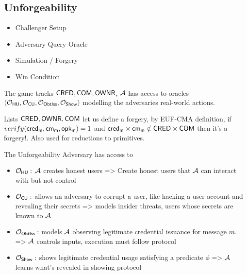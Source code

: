 \subsection{Unforgeability}
\begin{itemize}
    \item Challenger Setup
    \item Adversary Query Oracle
    \item Simulation / Forgery
    \item Win Condition
\end{itemize}
The game tracks $\mathsf{CRED}, \mathsf{COM}, \mathsf{OWNR}$, $\mathcal{A}$ has access to oracles $(\mathcal{O}_{\mathsf{HU}}, \mathcal{O}_{\mathsf{CU}}, \mathcal{O}_{\mathsf{ObtIss}}, \mathcal{O}_{\mathsf{Show}})$ modelling the adversaries real-world actions. 

Lists $\mathsf{CRED}, \mathsf{OWNR}, \mathsf{COM}$ let us define a forgery, by EUF-CMA definition, if $verify(\mathsf{cred_m}, \mathsf{cm_m}, \mathsf{opk_m}) = 1$ and $\mathsf{cred_m} \times \mathsf{cm_m} \notin \mathsf{CRED} \times \mathsf{COM}$ then it's a forgery!. Also used for reductions to primitives.

The Unforgeability Adversary has access to 
\begin{itemize}
    \item $\mathcal{O}_{\mathsf{HU}}:$ $\mathcal{A}$ creates honest users => Create honest users that $\mathcal{A}$ can interact with but not control
    \item $\mathcal{O}_{\mathsf{CU}}:$ allows an adversary to corrupt a user, like hacking a user account and revealing their secrets => models insider threats, users whose secrets are known to $\mathcal{A}$
    \item $\mathcal{O}_{\mathsf{ObtIss}}:$ models $\mathcal{A}$ observing legitimate credential issuance for message $m$. => $\mathcal{A}$ controls inputs, execution must follow protocol
    \item $\mathcal{O}_{\mathsf{Show}}:$ shows legitimate credential usage satisfying a predicate $\phi$ => $\mathcal{A}$ learns what's revealed in showing protocol
\end{itemize}


